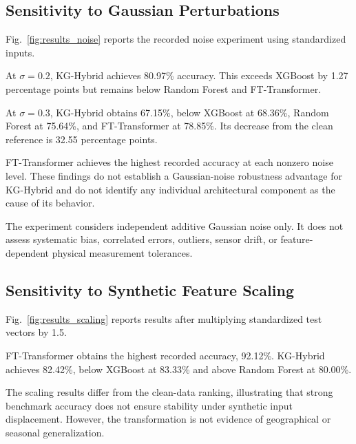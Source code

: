 \subsection{Sensitivity to Gaussian Perturbations}

Fig.~\ref{fig:results_noise} reports the recorded noise
experiment using standardized inputs.



At $\sigma=0.2$, KG-Hybrid achieves 80.97\% accuracy.
This exceeds XGBoost by 1.27 percentage points but remains
below Random Forest and FT-Transformer.

At $\sigma=0.3$, KG-Hybrid obtains 67.15\%, below
XGBoost at 68.36\%, Random Forest at 75.64\%, and
FT-Transformer at 78.85\%. Its decrease from the clean
reference is 32.55 percentage points.

FT-Transformer achieves the highest recorded accuracy at each
nonzero noise level. These findings do not establish a Gaussian-noise
robustness advantage for KG-Hybrid and do not identify any
individual architectural component as the cause of its behavior.

The experiment considers independent additive Gaussian noise only.
It does not assess systematic bias, correlated errors, outliers,
sensor drift, or feature-dependent physical measurement tolerances.

\subsection{Sensitivity to Synthetic Feature Scaling}

Fig.~\ref{fig:results_scaling} reports results after multiplying
standardized test vectors by 1.5.



FT-Transformer obtains the highest recorded accuracy,
92.12\%. KG-Hybrid achieves 82.42\%, below XGBoost
at 83.33\% and above Random Forest at 80.00\%.

The scaling results differ from the clean-data ranking,
illustrating that strong benchmark accuracy does not ensure
stability under synthetic input displacement. However, the
transformation is not evidence of geographical or seasonal
generalization.

